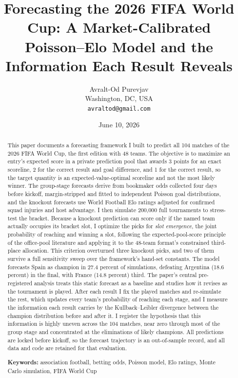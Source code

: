 \documentclass[11pt,letterpaper]{article}
\title{\textbf{Forecasting the 2026 FIFA World Cup: A Market-Calibrated Poisson--Elo Model and the Information Each Result Reveals}}
\author{Avralt-Od Purevjav\\ \small Washington, DC, USA \\ \small \texttt{avraltod@gmail.com}}
\date{June 10, 2026}
\begin{document}
\maketitle

\begin{abstract}
\noindent This paper documents a forecasting framework I built to predict all 104 matches of the 2026 FIFA World Cup, the first edition with 48 teams. The objective is to maximize an entry's expected score in a private prediction pool that awards 3 points for an exact scoreline, 2 for the correct result and goal difference, and 1 for the correct result, so the target quantity is an expected-value-optimal scoreline and not the most likely winner. The group-stage forecasts derive from bookmaker odds collected four days before kickoff, margin-stripped and fitted to independent Poisson goal distributions, and the knockout forecasts use World Football Elo ratings adjusted for confirmed squad injuries and host advantage. I then simulate 200{,}000 full tournaments to stress-test the bracket. Because a knockout prediction can score only if the named team actually occupies its bracket slot, I optimize the picks for \emph{slot emergence}, the joint probability of reaching and winning a slot, following the expected-pool-score principle of the office-pool literature and applying it to the 48-team format's constrained third-place allocation. This criterion overturned three knockout picks, and two of them survive a full sensitivity sweep over the framework's hand-set constants. The model forecasts Spain as champion in 27.4 percent of simulations, defeating Argentina (18.6 percent) in the final, with France (14.8 percent) third. The paper's central pre-registered analysis treats this static forecast as a baseline and studies how it revises as the tournament is played. After each result I fix the played matches and re-simulate the rest, which updates every team's probability of reaching each stage, and I measure the information each result carries by the Kullback--Leibler divergence between the champion distribution before and after it. I register the hypothesis that this information is highly uneven across the 104 matches, near zero through most of the group stage and concentrated at the eliminations of likely champions. All predictions are locked before kickoff, so the forecast trajectory is an out-of-sample record, and all data and code are retained for that evaluation.

\medskip
\noindent\textbf{Keywords:} association football, betting odds, Poisson model, Elo ratings, Monte Carlo simulation, FIFA World Cup
\end{abstract}
\end{document}
